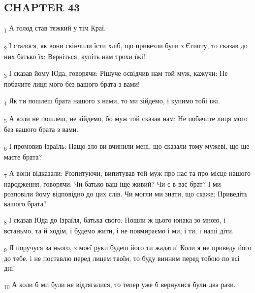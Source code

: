 \subsection{CHAPTER 43}
\begin{tcolorbox}
\textsubscript{1} А голод став тяжкий у тім Краї.
\end{tcolorbox}
\begin{tcolorbox}
\textsubscript{2} І сталося, як вони скінчили їсти хліб, що привезли були з Єгипту, то сказав до них батько їх: Верніться, купіть нам трохи їжі!
\end{tcolorbox}
\begin{tcolorbox}
\textsubscript{3} І сказав йому Юда, говорячи: Рішуче освідчив нам той муж, кажучи: Не побачите лиця мого без вашого брата з вами!
\end{tcolorbox}
\begin{tcolorbox}
\textsubscript{4} Як ти пошлеш брата нашого з нами, то ми зійдемо, і купимо тобі їжі.
\end{tcolorbox}
\begin{tcolorbox}
\textsubscript{5} А коли не пошлеш, не зійдемо, бо муж той сказав нам: Не побачите лиця мого без вашого брата з вами.
\end{tcolorbox}
\begin{tcolorbox}
\textsubscript{6} І промовив Ізраїль: Нащо зло ви вчинили мені, що сказали тому мужеві, що ще маєте брата?
\end{tcolorbox}
\begin{tcolorbox}
\textsubscript{7} А вони відказали: Розпитуючи, випитував той муж про нас та про місце нашого народження, говорячи: Чи батько ваш іще живий? Чи є в вас брат? І ми розповіли йому відповідно до цих слів. Чи могли ми знати, що скаже: Приведіть вашого брата?
\end{tcolorbox}
\begin{tcolorbox}
\textsubscript{8} І сказав Юда до Ізраїля, батька свого: Пошли ж цього юнака зо мною, і встаньмо, та й ходім, і будемо жити, і не повмираємо і ми, і ти, і наші діти.
\end{tcolorbox}
\begin{tcolorbox}
\textsubscript{9} Я поручуся за нього, з моєї руки будеш його ти жадати! Коли я не приведу його до тебе, і не поставлю перед лицем твоїм, то буду винним перед тобою по всі дні!
\end{tcolorbox}
\begin{tcolorbox}
\textsubscript{10} А коли б ми були не відтягалися, то тепер уже б вернулися були два рази.
\end{tcolorbox}
